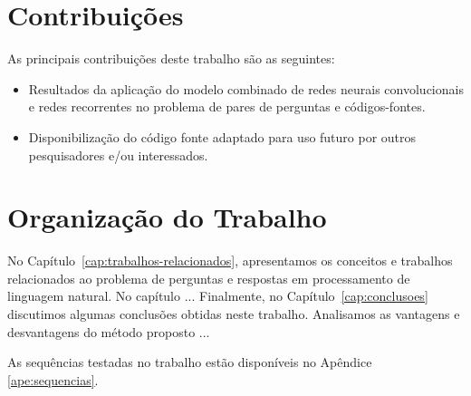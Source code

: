 \section{Contribuições}
\label{sec:contribucoes}

As principais contribuições deste trabalho são as seguintes:

\begin{itemize}
  \item Resultados da aplicação do modelo combinado de redes neurais convolucionais e redes recorrentes no problema de pares de perguntas e códigos-fontes.
  \item Disponibilização do código fonte adaptado para uso futuro por outros pesquisadores e/ou interessados.
\end{itemize}

\section{Organização do Trabalho}
\label{sec:organizacao_trabalho}

No Capítulo~\ref{cap:trabalhos-relacionados}, apresentamos os conceitos e trabalhos relacionados ao problema de perguntas e respostas em processamento de linguagem natural. No capítulo ... Finalmente, no
Capítulo~\ref{cap:conclusoes} discutimos algumas conclusões obtidas neste
trabalho. Analisamos as vantagens e desvantagens do método proposto ... 

As sequências testadas no trabalho estão disponíveis no Apêndice \ref{ape:sequencias}.
